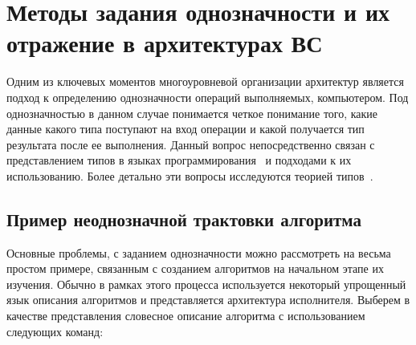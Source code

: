 
\chapter{Методы задания однозначности и их отражение в архитектурах ВС}

Одним из ключевых моментов многоуровневой организации архитектур является подход к определению однозначности операций выполняемых, компьютером. Под однозначностью в данном случае понимается четкое понимание того, какие данные какого типа поступают на вход операции и какой получается тип результата после ее выполнения. Данный вопрос непосредственно связан с представлением типов в языках программирования~\cite{types-in-prog-lang} и подходами к их использованию. Более детально эти вопросы исследуются теорией типов~\cite{types-theory}.

\section{Пример неоднозначной трактовки алгоритма}

Основные проблемы, с заданием однозначности можно рассмотреть на весьма простом примере, связанным с созданием алгоритмов на начальном этапе их изучения. Обычно в рамках этого процесса используется некоторый упрощенный язык описания алгоритмов и представляется архитектура исполнителя. Выберем в качестве представления словесное описание алгоритма с использованием следующих команд:

